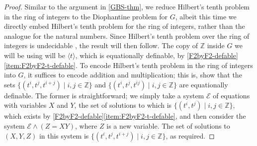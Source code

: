 \documentclass[11pt]{amsart}
\theoremstyle{definition}
\numberwithin{theorem}{section}
\newcommand{\Z}{\mathbb{Z}}
\begin{document}
\begin{proof}
		Similar to the argument in \cref{GBS-thm}, we reduce Hilbert's tenth
		problem in the ring of integers to the Diophantine problem for \(G\),
		albeit this time we directly embed Hilbert's tenth problem for the ring
		of integers, rather than the analogue for the natural numbers. Since
		Hilbert's tenth problem over the ring of integers is undecidable
		\cite{Matijasevic}, the result will then follow. The copy of \(\Z\)
		inside \(G\) we will be using will be \(\langle t \rangle\), which is
		equationally definable, by
		\cref{F2byF2-defable}\eqref{item:F2byF2-t-defable}. To encode Hilbert's
		tenth problem in the ring of integers into \(G\), it suffices to encode
		addition and multiplication; this is, show that the sets \(\{(t^i, t^j,
		t^{i + j}) \mid i, j \in \Z\}\) and \(\{(t^i, t^j, t^{ij}) \mid i, j
\in \Z\}\) are equationally definable.  The former is straightforward; we
simply take a system \(\mathcal E\) of equations with variables \(X\) and \(Y\),
the set of solutions to which is \(\{(t^i, t^j) \mid i, j \in \Z\}\), which
exists by \cref{F2byF2-defable}\eqref{item:F2byF2-t-defable}, and then consider
the system \(\mathcal E \wedge (Z = X Y)\), where \(Z\) is a new variable. The
set of solutions to \((X, Y, Z)\) in this system is \(\{(t^i, t^j, t^{i + j})
\mid i, j \in \Z\}\), as required.


\end{proof}
\end{document}
